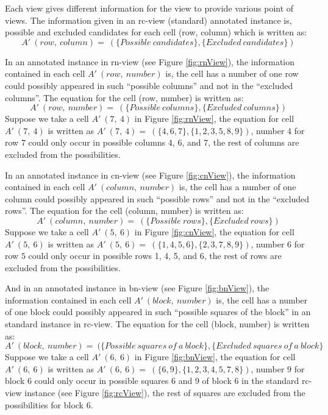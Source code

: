 \documentclass[11pt]{report}
\newcommand{\set}[1]{\{ #1 \}}
\begin{document}
Each view gives different information for the view to provide various point of views. The information given in an rc-view (standard) annotated instance is, possible and excluded candidates for each cell (row, column) which is written as:
\begin{displaymath}
A'\ (row,\ column) =\ (\set{{P}ossible\ candidates}, \set{{E}xcluded\ candidates})
\end{displaymath}


In an annotated instance in rn-view (see Figure \ref{fig:rnView}), the information contained in each cell $A'\ (row,\ number)$ is, the cell has a number of one row could possibly appeared in such ``possible columns'' and not in the ``excluded columns''. The equation for the cell (row, number) is written as:
\begin{displaymath}
A'\ (row,\ number) =\ (\set{{P}ossible\ columns}, \set{{E}xcluded\ columns})
\end{displaymath}
Suppose we take a cell $A'\ (7,\ 4)$ in Figure \ref{fig:rnView}, the equation for cell $A'\ (7,\ 4)$ is written as $A'\ (7,\ 4) =\ (\set{4, 6, 7}, \set{1, 2, 3, 5, 8, 9} )$, number $4$ for row $7$ could only occur in possible columns 4, 6, and 7, the rest of columns are excluded from the possibilities.


In an annotated instance in cn-view (see Figure \ref{fig:cnView}), the information contained in each cell $A'\ (column,\ number)$ is, the cell has a number of one column could possibly appeared in such ``possible rows'' and not in the ``excluded rows''. The equation for the cell (column, number) is written as:
\begin{displaymath}
A'\ (column,\ number) =\ (\set{{P}ossible\ rows}, \set{{E}xcluded\ rows})
\end{displaymath}
Suppose we take a cell $A'\ (5,\ 6)$ in Figure \ref{fig:cnView}, the equation for cell $A'\ (5,\ 6)$ is written as $A'\ (5,\ 6) =\ (\set{1, 4, 5, 6}, \set{2, 3, 7, 8, 9} )$, number $6$ for row $5$ could only occur in possible rows 1, 4, 5, and 6, the rest of rows are excluded from the possibilities.

And in an annotated instance in bn-view (see Figure \ref{fig:bnView}), the information contained in each cell $A'\ (block,\ number)$ is, the cell has a number of one block could possibly appeared in such ``possible squares of the block'' in an standard instance in rc-view. The equation for the cell (block, number) is written as:
\begin{displaymath}
A'\ (block,\ number) =\ (\set{{P}ossible\ squares\ of\ a\ block}, \set{{E}xcluded\ squares\ of\ a\ block}
\end{displaymath}
Suppose we take a cell $A'\ (6,\ 6)$ in Figure \ref{fig:bnView}, the equation for cell $A'\ (6,\ 6)$ is written as $A'\ (6,\ 6) =\ (\set{6, 9}, \set{1, 2, 3, 4, 5, 7, 8} )$, number $9$ for block $6$ could only occur in possible squares 6 and 9 of block $6$ in the standard rc-view instance (see Figure \ref{fig:rcView}), the rest of squares are excluded from the possibilities for block $6$.
\end{document}
